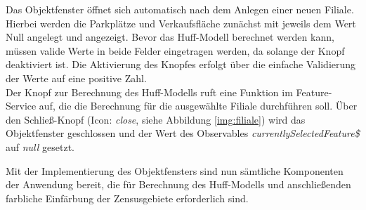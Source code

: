 Das Objektfenster öffnet sich automatisch nach dem Anlegen einer neuen Filiale.
Hierbei werden die Parkplätze und Verkaufsfläche zunächst mit jeweils dem Wert Null angelegt und angezeigt.
Bevor das Huff-Modell berechnet werden kann, müssen valide Werte in beide Felder eingetragen werden, da solange der Knopf deaktiviert ist.
Die Aktivierung des Knopfes erfolgt über die einfache Validierung der Werte auf eine positive Zahl.\\
Der Knopf zur Berechnung des Huff-Modells ruft eine Funktion im Feature-Service auf, die die Berechnung für die ausgewählte Filiale durchführen soll.
Über den Schließ-Knopf (Icon: \emph{close}, siehe Abbildung \ref{img:filiale}) wird das Objektfenster geschlossen und der Wert des Observables \emph{currentlySelectedFeature\$} auf \emph{null} gesetzt.

Mit der Implementierung des Objektfensters sind nun sämtliche Komponenten der Anwendung bereit, die für Berechnung des Huff-Modells und anschließenden farbliche Einfärbung der Zensusgebiete erforderlich sind.

